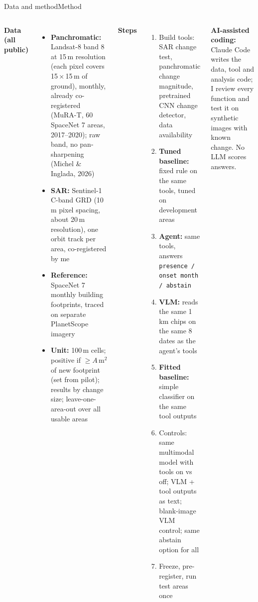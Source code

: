 \documentclass[aspectratio=169,11pt]{beamer}
\begin{document}
\begin{frame}[shrink=26]{Data and method}{Method}
\begin{columns}[T,onlytextwidth]
\textbf{\small Data (all public)}
\begin{itemize}\footnotesize
  \item \textbf{Panchromatic:} Landsat-8 band 8 at 15\,m resolution (each pixel covers 15\,$\times$\,15\,m of ground), monthly, already co-registered (MuRA-T, 60 SpaceNet 7 areas, 2017--2020); raw band, no pan-sharpening (Michel \& Inglada, 2026)
  \item \textbf{SAR:} Sentinel-1 C-band GRD (10\,m pixel spacing, about 20\,m resolution), one orbit track per area, co-registered by me
  \item \textbf{Reference:} SpaceNet 7 monthly building footprints, traced on separate PlanetScope imagery
  \item \textbf{Unit:} 100\,m cells; positive if $\geq A$\,m$^2$ of new footprint (set from pilot); results by change size; leave-one-area-out over all usable areas
\end{itemize}
\textbf{\small Steps}
\begin{enumerate}\footnotesize
  \item Build tools: SAR change test, panchromatic change magnitude, pretrained CNN change detector, data availability
  \item \textbf{Tuned baseline:} fixed rule on the same tools, tuned on development areas
  \item \textbf{Agent:} same tools, answers \texttt{presence / onset month / abstain}
  \item \textbf{VLM:} reads the same 1\,km chips on the same 8 dates as the agent's tools
  \item \textbf{Fitted baseline:} simple classifier on the same tool outputs
  \item Controls: same multimodal model with tools on vs off; VLM + tool outputs as text; blank-image VLM control; same abstain option for all
  \item Freeze, pre-register, run test areas once
\end{enumerate}
{\footnotesize\textbf{AI-assisted coding:} Claude Code writes the data, tool and analysis code; I review every function and test it on synthetic images with known change. No LLM scores answers.}
\end{columns}
\end{frame}
\end{document}
